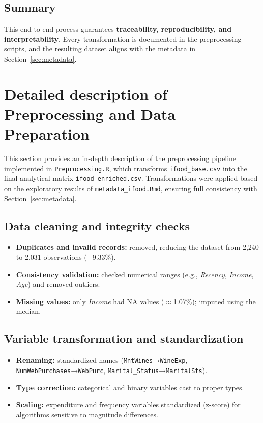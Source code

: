 \subsection{Summary}

This end‐to‐end process guarantees \textbf{traceability, reproducibility, and
interpretability}. Every transformation is documented in the preprocessing scripts,
and the resulting dataset aligns with the metadata in Section~\ref{sec:metadata}.


\newpage
\section{Detailed description of Preprocessing and Data Preparation}

This section provides an in‐depth description of the preprocessing pipeline
implemented in \texttt{Preprocessing.R}, which transforms
\texttt{ifood\_base.csv} into the final analytical matrix
\texttt{ifood\_enriched.csv}.  
Transformations were applied based on the exploratory results of
\texttt{metadata\_ifood.Rmd}, ensuring full consistency with Section~\ref{sec:metadata}.

\subsection{Data cleaning and integrity checks}

\begin{itemize}[leftmargin=1.2cm]
    \item \textbf{Duplicates and invalid records:} removed, reducing the dataset
    from 2,240 to 2,031 observations (−9.33\%).
    \item \textbf{Consistency validation:} checked numerical ranges (e.g.,
    \textit{Recency}, \textit{Income}, \textit{Age}) and removed outliers.
    \item \textbf{Missing values:} only \textit{Income} had NA values
    ($\approx$1.07\%); imputed using the median.
\end{itemize}

\subsection{Variable transformation and standardization}

\begin{itemize}[leftmargin=1.2cm]
    \item \textbf{Renaming:} standardized names
    (\texttt{MntWines}→\texttt{WineExp}, \texttt{NumWebPurchases}→\texttt{WebPurc},
    \texttt{Marital\_Status}→\texttt{MaritalSts}).
    \item \textbf{Type correction:} categorical and binary variables cast to proper types.
    \item \textbf{Scaling:} expenditure and frequency variables standardized (z‐score)
    for algorithms sensitive to magnitude differences.
\end{itemize}

